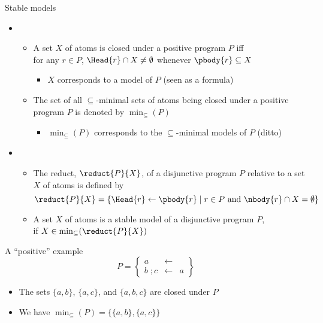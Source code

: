 \begin{frame}{Stable models}
  \begin{itemize}
  \item {}
    \begin{itemize}
    \item A set $X$ of atoms is \alert{closed under} a positive program $P$ iff
      \\for any $r\in P$, $\Head{r}\cap X\neq\emptyset$ whenever $\pbody{r}\subseteq X$
      \begin{itemize}
      \item $X$ corresponds to a model of $P$ (seen as a formula)
      \end{itemize}
    \item The set of all $\subseteq$-minimal sets of atoms being closed under a positive
      program $P$ is denoted by $\min_\subseteq(P)$
      \begin{itemize}
      \item $\min_\subseteq(P)$ corresponds to the $\subseteq$-minimal models of $P$ (ditto)
      \end{itemize}
    \end{itemize}
  \item<2-> 
    \begin{itemize}
    \item<2-> The \alert{reduct}, $\reduct{P}{X}$, of a disjunctive program $P$ relative to
      a set $X$ of atoms is defined by
      \[
      \reduct{P}{X}
      =
      \{\Head{r}\leftarrow\pbody{r} \mid r\in P \text{ and } \nbody{r}\cap X=\emptyset\}
      \]
    \item<3-> A set $X$ of atoms is a \alert{stable model} of a disjunctive program $P$,\\
      if $X\in\min_\subseteq(\reduct{P}{X})$
    \end{itemize}
  \end{itemize}

\end{frame}
\begin{frame}{A ``positive'' example}
\[
P
=
\left\{
  \begin{array}{lcl}
    a&\leftarrow&
    \\
    b\;;c&\leftarrow& a
  \end{array}
\right\}
\]

\pause

\begin{itemize}
\item The sets $\{a,b\}$, $\{a,c\}$, and $\{a,b,c\}$ are closed under $P$
  \pause
\item We have $\min_\subseteq(P)=\{  \{a,b\},  \{a,c\}  \}$
\end{itemize}
\end{frame}
